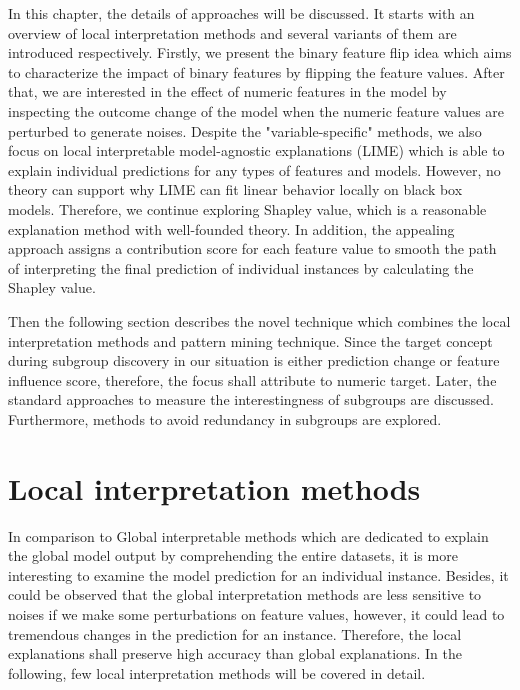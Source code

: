 In this chapter, the details of approaches will be discussed. It starts with an overview of local interpretation methods and several variants of them are introduced respectively. Firstly, we present the binary feature flip idea which aims to characterize the impact of binary features by flipping the feature values. After that, we are interested in the effect of numeric features in the model by inspecting the outcome change of the model when the numeric feature values are perturbed to generate noises. Despite the "variable-specific" methods, we also focus on local interpretable model-agnostic explanations (LIME) which is able to explain individual predictions for any types of features and models. However, no theory can support why LIME can fit linear behavior locally on black box models. Therefore, we continue exploring Shapley value, which is a reasonable explanation method with well-founded theory. In addition, the appealing approach assigns a contribution score for each feature value to smooth the path of interpreting the final prediction of individual instances by calculating the Shapley value. 

Then the following section describes the novel technique which combines the local interpretation methods and pattern mining technique. Since the target concept during subgroup discovery in our situation is either prediction change or feature influence score, therefore, the focus shall attribute to numeric target. Later, the standard approaches to measure the interestingness of subgroups are discussed. Furthermore, methods to avoid redundancy in subgroups are explored. 

\section{Local interpretation methods}

In comparison to Global interpretable methods which are dedicated to explain the global model output by comprehending the entire datasets, it is more interesting to examine the model prediction for an individual instance. Besides, it could be observed that the global interpretation methods are less sensitive to noises if we make some perturbations on feature values, however, it could lead to tremendous changes in the prediction for an instance. Therefore, the local explanations shall preserve high accuracy than global explanations. In the following, few local interpretation methods will be covered in detail. 

